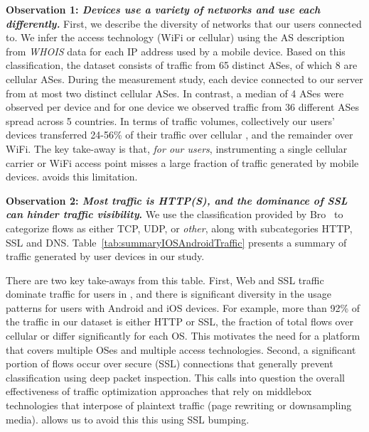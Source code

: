 \noindent\textbf{Observation 1: \emph{Devices use a variety of networks and use each differently.}} First, we describe the diversity 
of networks that our users connected to. 
We infer the access technology (WiFi or cellular) using the AS description from \emph{WHOIS} data for each IP address used by a mobile device.
Based on this classification, the \mobWild dataset consists of traffic from 65 distinct ASes, of which 8 are cellular ASes.
During the measurement study, each device connected to our \platname server from at most two distinct cellular ASes. 
In contrast, a median of 4 \wifi ASes were observed per device and for one device we observed traffic from 36 different \wifi ASes spread across 5 countries.
In terms of traffic volumes, collectively our users'  devices transferred 24-56\% of their traffic over cellular , and the 
remainder over WiFi. 
The key take-away is that, \emph{for our users}, instrumenting a single cellular carrier or WiFi access point misses a 
large fraction of traffic generated by mobile devices. \platname{} avoids this limitation.

\noindent\textbf{Observation 2: \emph{Most traffic is HTTP(S), and the dominance of SSL can hinder traffic visibility}.} We use the classification 
provided by Bro~\cite{bro} to categorize flows as either TCP, UDP, or \emph{other}, along with subcategories HTTP, SSL and DNS.
Table~\ref{tab:summaryIOSAndroidTraffic} presents a 
summary of traffic generated by user devices in our study. 

There are two key  
take-aways from this table. First, Web and SSL traffic dominate traffic for users in \mobWild, 
and there is significant diversity in the usage patterns for 
users with Android and iOS devices. For example, more than 92\% of the traffic in our \mobWild dataset is either HTTP or SSL, 
the fraction of total flows over cellular or \wifi differ significantly for each OS. This motivates the need for a platform that covers 
multiple OSes and multiple access technologies. Second, a significant portion of flows occur over secure (SSL) connections 
that generally prevent classification using deep packet inspection. This calls into question 
the overall effectiveness of traffic optimization approaches that rely 
on middlebox technologies that interpose of plaintext traffic (\eg page rewriting or 
downsampling media). \meddle allows us to avoid this this using SSL bumping.

